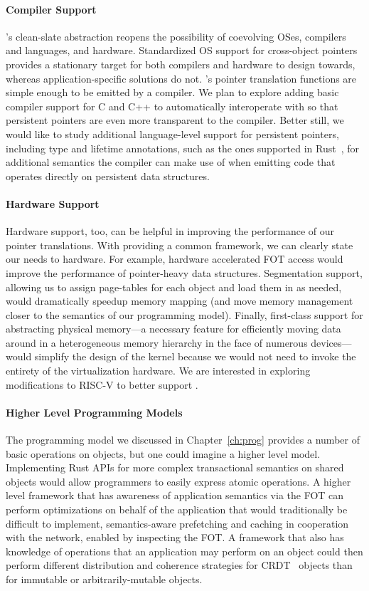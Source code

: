 \paragraph{Compiler Support}
\Twizzler's clean-slate \NVM abstraction reopens the possibility of coevolving OSes, compilers and
languages, and hardware.
Standardized OS support for cross-object pointers provides a stationary target for both
compilers and hardware to design towards, whereas application-specific solutions do not.
\Twizzler's pointer translation functions are simple enough to be emitted by a compiler. We plan
to explore adding basic compiler support for C and C++ to automatically interoperate with
\Twizzler so that persistent pointers are even more transparent to the compiler. Better still,
we would like to study additional language-level support for persistent pointers, including type
and lifetime annotations, such as the ones supported in Rust~\cite{rust}, for additional semantics the
compiler can make use of when emitting code that operates directly on persistent data
structures.

\paragraph{Hardware Support}
Hardware support, too, can be helpful in improving the performance of our pointer translations.
With \Twizzler providing a common framework, we can clearly state our needs to hardware. For
example, hardware accelerated FOT access would improve the performance of pointer-heavy data
structures. Segmentation support, allowing us to assign page-tables for each object and load
them in as needed, would dramatically speedup memory mapping (and move memory management closer
to the semantics of our programming model). Finally, first-class support for abstracting
physical memory---a necessary feature for efficiently moving data around in a heterogeneous
memory hierarchy in the face of numerous devices---would simplify the design of the kernel
because we would not need to invoke the entirety of the virtualization hardware. We are
interested in exploring modifications to RISC-V to better support \Twizzler.

\paragraph{Higher Level Programming Models}

The programming model we discussed in Chapter~\ref{ch:prog} provides a number of basic operations on objects, but one
could imagine a higher level model. Implementing Rust APIs for more complex transactional semantics on shared objects
would allow programmers to easily express atomic operations. A higher level framework that has awareness of application
semantics via the FOT can perform optimizations on behalf of the application that would traditionally be difficult to
implement, \eg semantics-aware prefetching and caching in cooperation with the network, enabled by inspecting the FOT. A
framework that also has knowledge of operations that an application may perform on an object could then perform
different distribution and coherence strategies for CRDT~\cite{shapiro2011comprehensive} objects than for immutable or
arbitrarily-mutable objects.

